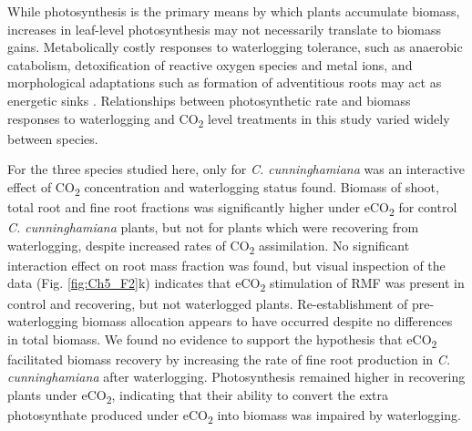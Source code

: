 \documentclass[12pt,a4paper]{memoir}
\begin{document}
While photosynthesis is the primary means by which plants accumulate biomass, increases in leaf-level photosynthesis may not necessarily translate to biomass gains. Metabolically costly responses to waterlogging tolerance, such as anaerobic catabolism, detoxification of reactive oxygen species and metal ions, and morphological adaptations such as formation of adventitious roots may act as energetic sinks \citep{Colmer2009}. Relationships between photosynthetic rate and biomass responses to waterlogging and CO\textsubscript{2} level treatments in this study varied widely between species.

For the three species studied here, only for \textit{C. cunninghamiana} was an interactive effect of CO\textsubscript{2} concentration and waterlogging status found. Biomass of shoot, total root and fine root fractions was significantly higher under eCO\textsubscript{2} for control \textit{C. cunninghamiana} plants, but not for plants which were recovering from waterlogging, despite increased rates of CO\textsubscript{2} assimilation. No significant interaction effect on root mass fraction was found, but visual inspection of the data (Fig. \ref{fig:Ch5_F2}k) indicates that eCO\textsubscript{2} stimulation of RMF was present in control and recovering, but not waterlogged plants. Re-establishment of pre-waterlogging biomass allocation appears to have occurred despite no differences in total biomass. We found no evidence to support the hypothesis that eCO\textsubscript{2} facilitated biomass recovery by increasing the rate of fine root production in \textit{C. cunninghamiana} after waterlogging. Photosynthesis remained higher in recovering plants under eCO\textsubscript{2}, indicating that their ability to convert the extra photosynthate produced under eCO\textsubscript{2} into biomass was impaired by waterlogging. 
\end{document}
